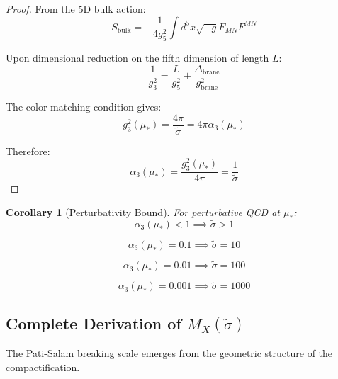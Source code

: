 \documentclass[11pt,letterpaper]{article}
\newtheorem{corollary}[theorem]{Corollary}
\newcommand{\st}{\tilde{\sigma}}
\begin{document}
\begin{proof}
From the 5D bulk action:
\begin{equation}
S_{\text{bulk}} = -\frac{1}{4g_5^2} \int d^5x \sqrt{-g} F_{MN}F^{MN}
\label{eq:bulk-action}
\end{equation}

Upon dimensional reduction on the fifth dimension of length $L$:
\begin{equation}
\frac{1}{g_3^2} = \frac{L}{g_5^2} + \frac{\Delta_{\text{brane}}}{g_{\text{brane}}^2}
\label{eq:dim-reduction}
\end{equation}

The color matching condition gives:
\begin{equation}
g_3^2(\mu_*) = \frac{4\pi}{\st} = 4\pi \alpha_3(\mu_*)
\label{eq:color-matching-g3}
\end{equation}

Therefore:
\begin{equation}
\alpha_3(\mu_*) = \frac{g_3^2(\mu_*)}{4\pi} = \frac{1}{\st}
\label{eq:alpha3-from-matching}
\end{equation}
\end{proof}

\begin{corollary}[Perturbativity Bound]
\label{cor:perturbativity}
For perturbative QCD at $\mu_*$:
\begin{equation}
\alpha_3(\mu_*) < 1 \implies \st > 1
\label{eq:perturbativity-bound}
\end{equation}
\end{corollary}

\begin{equation}
\alpha_3(\mu_*) = 0.1 \implies \st = 10
\label{eq:alpha3-example1}
\end{equation}

\begin{equation}
\alpha_3(\mu_*) = 0.01 \implies \st = 100
\label{eq:alpha3-example2}
\end{equation}

\begin{equation}
\alpha_3(\mu_*) = 0.001 \implies \st = 1000
\label{eq:alpha3-example3}
\end{equation}

\subsection{Complete Derivation of $M_X(\st)$}
\label{app:mx-derivation}

The Pati-Salam breaking scale emerges from the geometric structure of the compactification.
\end{document}
